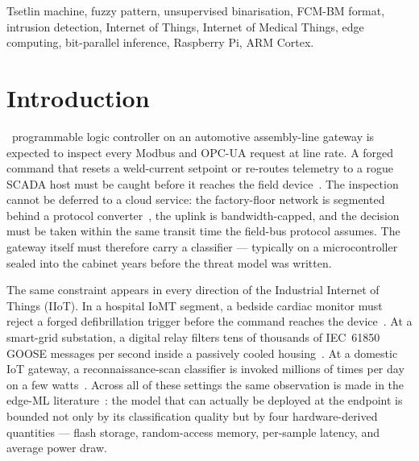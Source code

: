 \documentclass[journal,10pt]{IEEEtran}
\begin{document}
\begin{IEEEkeywords}
Tsetlin machine, fuzzy pattern, unsupervised binarisation,
FCM-BM format, intrusion detection, Internet of Things,
Internet of Medical Things, edge computing, bit-parallel
inference, Raspberry Pi, ARM Cortex.
\end{IEEEkeywords}

\section{Introduction}
\label{sec:intro}

~programmable logic controller on an automotive
assembly-line gateway is expected to inspect every Modbus and OPC-UA
request at line rate. A forged command that resets a weld-current
setpoint or re-routes telemetry to a rogue SCADA host must be caught
before it reaches the field device~\cite{stouffer2015nist,
morris2014industrial}. The inspection cannot be deferred to a cloud
service: the factory-floor network is segmented behind a protocol
converter~\cite{galloway2013scada}, the uplink is bandwidth-capped,
and the decision must be taken within the same transit time the
field-bus protocol assumes. The gateway itself must therefore carry
a classifier --- typically on a microcontroller sealed into the
cabinet years before the threat model was written.

The same constraint appears in every direction of the Industrial
Internet of Things (IIoT). In a hospital IoMT segment, a bedside
cardiac monitor must reject a forged defibrillation trigger before
the command reaches the device~\cite{yaqoob2019security}. At a
smart-grid substation, a digital relay filters tens of thousands of
IEC~61850 GOOSE messages per second inside a passively cooled
housing~\cite{hong2014cyber}. At a domestic IoT gateway, a
reconnaissance-scan classifier is invoked millions of times per day
on a few watts~\cite{kolias2017ddos,meidan2018nbaiot}. Across all
of these settings the same observation is made in the edge-ML
literature~\cite{david2021tflm,warden2020tinyml,dhar2021survey}: the
model that can actually be deployed at the endpoint is bounded not
only by its classification quality but by four hardware-derived
quantities --- flash storage, random-access memory, per-sample
latency, and average power draw.
\end{document}
